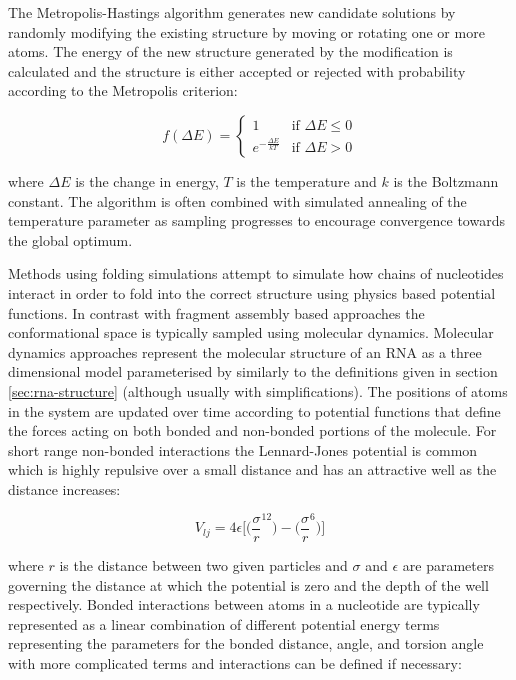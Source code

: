 \documentclass[journal]{IEEEtran}
\begin{document}
The Metropolis-Hastings algorithm generates new candidate solutions by randomly modifying the existing structure by moving or rotating one or more atoms. The energy of the new structure generated by the modification is calculated and the structure is either accepted or rejected with probability according to the Metropolis criterion:

\begin{equation}
\label{eq:metropolis-criterion}
f(\Delta E) = 
  \begin{cases} 
    1 & \text{if } \Delta E \leq 0 \\
    e^{-\frac{\Delta E}{kT}} & \text{if } \Delta E > 0
  \end{cases}
\end{equation}

where $\Delta E$ is the change in energy, $T$ is the temperature and $k$ is the Boltzmann constant. The algorithm is often combined with simulated annealing of the temperature parameter as sampling progresses to encourage convergence towards the global optimum. 

Methods using folding simulations attempt to simulate how chains of nucleotides interact in order to fold into the correct structure using physics based potential functions. In contrast with fragment assembly based approaches the conformational space is typically sampled using molecular dynamics. Molecular dynamics approaches represent the molecular structure of an RNA as a three dimensional model parameterised by similarly to the definitions given in section \ref{sec:rna-structure} (although usually with simplifications). The positions of atoms in the system are updated over time according to potential functions that define the forces acting on both bonded and non-bonded portions of the molecule. For short range non-bonded interactions the Lennard-Jones potential is common which is highly repulsive over a small distance and has an attractive well as the distance increases:

\begin{equation}
\label{eq:lennard-jones}
	V_{lj} = 4\epsilon \bigg[ \bigg( \frac{\sigma}{r}^{12} \bigg) - \bigg( \frac{\sigma}{r}^6 \bigg) \bigg]
\end{equation}

where $r$ is the distance between two given particles and $\sigma$ and $\epsilon$ are parameters governing the distance at which the potential is zero and the depth of the well respectively. Bonded interactions between atoms in a nucleotide are typically represented as a linear combination of different potential energy terms representing the parameters for the bonded distance, angle, and torsion angle with more complicated terms and interactions can be defined if necessary:
\end{document}
